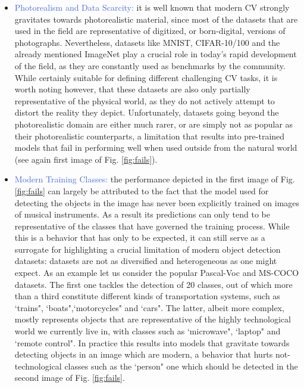 \begin{itemize}
	\item \textcolor{RoyalBlue}{Photorealism and Data Scarcity:} it is well known that modern CV strongly gravitates towards photorealistic material, since most of the datasets that are used in the field are representative of digitized, or born-digital, versions of photographs. Nevertheless, datasets like MNIST, CIFAR-10/100 and the already mentioned ImageNet play a crucial role in today's rapid development of the field, as they are constantly used as benchmarks by the community. While certainly suitable for defining different challenging CV tasks, it is worth noting however, that these datasets are also only partially representative of the physical world, as they do not actively attempt to distort the reality they depict. Unfortunately, datasets going beyond the photorealistic domain are either much rarer, or are simply not as popular as their photorealistic counterparts, a limitation that results into pre-trained models that fail in performing well when used outside from the natural world (see again first image of Fig. \ref{fig:fails}).  

	\item \textcolor{RoyalBlue}{Modern Training Classes:} the performance depicted in the first image of Fig. \ref{fig:fails} can largely be attributed to the fact that the model used for detecting the objects in the image has never been explicitly trained on images of musical instruments. As a result its predictions can only tend to be representative of the classes that have governed the training process. While this is a behavior that has only to be expected, it can still serve as a surrogate for highlighting a crucial limitation of modern object detection datasets: datasets are not as diversified and heterogeneous as one might expect. As an example let us consider the popular Pascal-Voc \cite{everingham2010pascal} and MS-COCO \cite{lin2014microsoft} datasets. The first one tackles the detection of 20 classes, out of which more than a third constitute different kinds of transportation systems, such as `trains", `boats",`motorcycles" and `cars". The latter, albeit more complex, mostly represents objects that are representative of the highly technological world we currently live in, with classes such as `microwave", `laptop" and `remote control". In practice this results into models that gravitate towards detecting objects in an image which are modern, a behavior that hurts not-technological classes such as the `person" one which should be detected in the second image of Fig. \ref{fig:fails}.     


\end{itemize}
